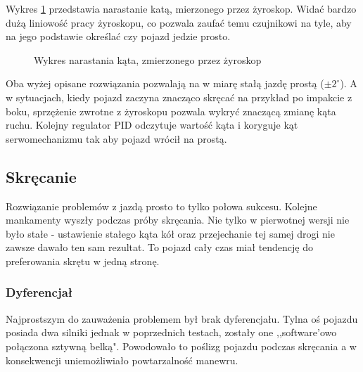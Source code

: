         Wykres \ref{plot:delta_angle_with_gyro} przedstawia narastanie katą, mierzonego przez żyroskop.
        Widać bardzo dużą liniowość pracy żyroskopu, co pozwala zaufać temu czujnikowi na tyle, aby na jego podstawie określać czy pojazd jedzie prosto.

        \begin{figure}[!ht]
            \centering
                \caption{Wykres narastania kąta, zmierzonego przez żyroskop}
                \label{plot:delta_angle_with_gyro}
        \end{figure}


    Oba wyżej opisane rozwiązania pozwalają na w miarę stałą jazdę prostą ($\pm 2^\circ$).
    A w sytuacjach, kiedy pojazd zaczyna znacząco skręcać na przykład po impakcie z boku, sprzężenie zwrotne z żyroskopu pozwala wykryć znaczącą zmianę kąta ruchu.
    Kolejny regulator PID odczytuje wartość kąta i koryguje kąt serwomechanizmu tak aby pojazd wrócił na prostą.

    \subsection{Skręcanie}
        Rozwiązanie problemów z jazdą prosto to tylko połowa sukcesu.
        Kolejne mankamenty wyszły podczas próby skręcania.
        Nie tylko w pierwotnej wersji nie było stałe - ustawienie stałego kąta kół oraz przejechanie tej samej drogi nie zawsze dawało ten sam rezultat.
        To pojazd cały czas miał tendencję do preferowania skrętu w jedną stronę.

        \subsubsection{Dyferencjał}
        \label{subsubsec:dyferencjal}
        Najprostszym do zauważenia problemem był brak dyferencjału.
        Tylna oś pojazdu posiada dwa silniki jednak w poprzednich testach, zostały one ,,software'owo połączona sztywną belką".
        Powodowało to poślizg pojazdu podczas skręcania a w konsekwencji uniemożliwiało powtarzalność manewru.

